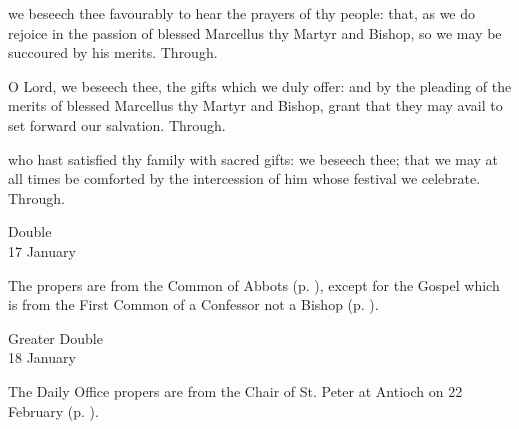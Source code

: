 \collect
{} we beseech thee favourably to hear the prayers of thy people: that, as we do rejoice in the passion of blessed Marcellus thy Martyr and Bishop, so we may be succoured by his merits. Through.



\secret
{} O Lord, we beseech thee, the gifts which we duly offer: and by the pleading of the merits of blessed Marcellus thy Martyr and Bishop, grant that they may avail to set forward our salvation. Through.


\postcommunion
{} who hast satisfied thy family with sacred gifts: we beseech thee; that we may at all times be comforted by the intercession of him whose festival we celebrate. Through.


\begin{inhead}
    {Double\\
17 January}
\end{inhead}

\begin{rubric}
	The propers are from the Common of Abbots (p. \pageref{CommonAbbots}), except for the Gospel which is from the First Common of a Confessor not a Bishop (p. \pageref{CommonConfessorNotBishopI}).
\end{rubric}


\begin{inhead}
    {Greater Double\\
18 January}
\end{inhead}

\begin{rubric}
	The Daily Office propers are from the Chair of St. Peter at Antioch on 22 February (p. \pageref{CathedraAntioch}).
\end{rubric}

